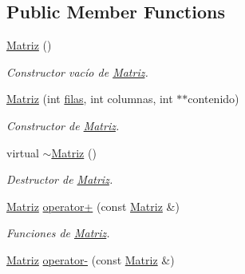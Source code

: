 \subsection*{Public Member Functions}
\begin{DoxyCompactItemize}
\item 
\hypertarget{class_matriz_a7de756301bddbc4b0b5d2a0f2b1fc695}{\hyperlink{class_matriz_a7de756301bddbc4b0b5d2a0f2b1fc695}{Matriz} ()}\label{class_matriz_a7de756301bddbc4b0b5d2a0f2b1fc695}

\begin{DoxyCompactList}\small\item\em Constructor vacío de \hyperlink{class_matriz}{Matriz}. \end{DoxyCompactList}\item 
\hypertarget{class_matriz_a9042b03b0030c81bc2d6acd3e90c3168}{\hyperlink{class_matriz_a9042b03b0030c81bc2d6acd3e90c3168}{Matriz} (int \hyperlink{class_matriz_a0696de23c471bd7b02c3724aa007276d}{filas}, int columnas, int $\ast$$\ast$contenido)}\label{class_matriz_a9042b03b0030c81bc2d6acd3e90c3168}

\begin{DoxyCompactList}\small\item\em Constructor de \hyperlink{class_matriz}{Matriz}. \end{DoxyCompactList}\item 
\hypertarget{class_matriz_a2092b7a289ecec369e1da407d5839f5a}{virtual \hyperlink{class_matriz_a2092b7a289ecec369e1da407d5839f5a}{$\sim$\+Matriz} ()}\label{class_matriz_a2092b7a289ecec369e1da407d5839f5a}

\begin{DoxyCompactList}\small\item\em Destructor de \hyperlink{class_matriz}{Matriz}. \end{DoxyCompactList}\item 
\hyperlink{class_matriz}{Matriz} \hyperlink{class_matriz_a3b34427eff71649f3611a9e6a5630f5e}{operator+} (const \hyperlink{class_matriz}{Matriz} \&)
\begin{DoxyCompactList}\small\item\em Funciones de \hyperlink{class_matriz}{Matriz}. \end{DoxyCompactList}\item 
\hypertarget{class_matriz_a582dd920be1081172511c6eeb941201f}{\hyperlink{class_matriz}{Matriz} \hyperlink{class_matriz_a582dd920be1081172511c6eeb941201f}{operator-\/} (const \hyperlink{class_matriz}{Matriz} \&)}\label{class_matriz_a582dd920be1081172511c6eeb941201f}


\end{DoxyCompactItemize}
